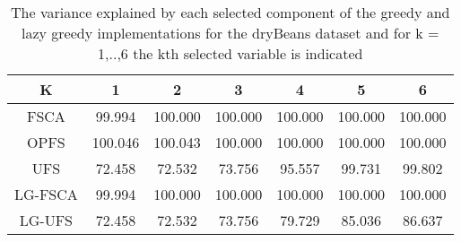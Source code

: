 \begin{table}
	\begin{center}
		\begin{tabular}{c c c c c c c}
			K & 1 & 2 & 3 & 4 & 5 & 6 \\
			\hline
			FSCA & 99.994 & 100.000 & 100.000 & 100.000 & 100.000 & 100.000 \\
			OPFS & 100.046 & 100.043 & 100.000 & 100.000 & 100.000 & 100.000 \\
			UFS & 72.458 & 72.532 & 73.756 & 95.557 & 99.731 & 99.802 \\
			LG-FSCA & 99.994 & 100.000 & 100.000 & 100.000 & 100.000 & 100.000 \\
			LG-UFS & 72.458 & 72.532 & 73.756 & 79.729 & 85.036 & 86.637 \\
		\end{tabular}
	\end{center}
	\caption{The variance explained by each selected component of the greedy and lazy greedy implementations for the dryBeans dataset and for k = 1,..,6 the kth selected variable is indicated}
\end{table}